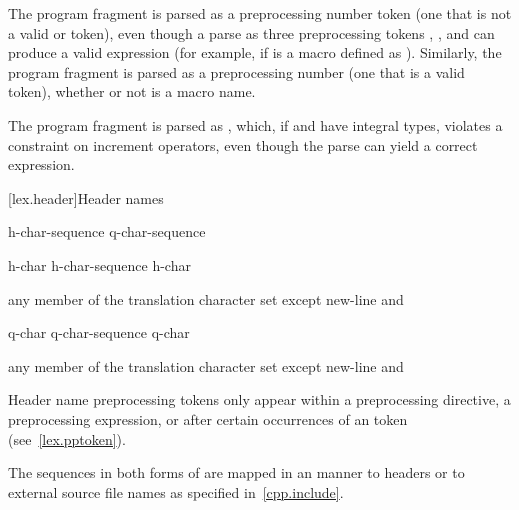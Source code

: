 \pnum
\begin{example}
The program fragment  is parsed as a
preprocessing number token (one that is not a valid
 or  token),
even though a parse as three preprocessing tokens
, \tcode{+}, and  can produce a valid expression (for example,
if  is a macro defined as ). Similarly, the
program fragment  is parsed as a preprocessing number (one
that is a valid  token),
whether or not  is a macro name.
\end{example}

\pnum
\begin{example}
The program fragment  is parsed as , which, if  and  have integral types,
violates a constraint on increment operators, even though the parse
 can yield a correct expression.
\end{example}

[lex.header]{Header names}

%
\begin{bnf}
\obeyspaces
{}\br
    \terminal{<} h-char-sequence \terminal{>}\br
     q-char-sequence 
\end{bnf}

\begin{bnf}
\br
    h-char\br
    h-char-sequence h-char
\end{bnf}

\begin{bnf}
\br
    \textnormal{any member of the translation character set except new-line and }
\end{bnf}

\begin{bnf}
\br
    q-char\br
    q-char-sequence q-char
\end{bnf}

\begin{bnf}
\br
    \textnormal{any member of the translation character set except new-line and }
\end{bnf}

\pnum
\begin{note}
Header name preprocessing tokens only appear within
a  preprocessing directive,
a  preprocessing expression, or
after certain occurrences of an  token
(see~\ref{lex.pptoken}).
\end{note}
The sequences in both forms of  are mapped in an
 manner to headers or to
external source file names as specified in~\ref{cpp.include}.


